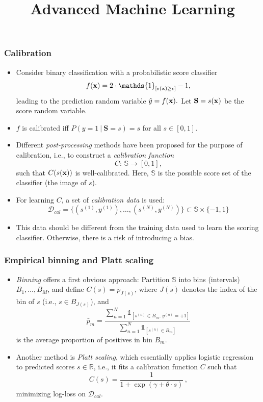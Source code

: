 \documentclass[11pt,compress,t,notes=noshow, xcolor=table]{beamer}
\title{Advanced Machine Learning}
\date{}
\begin{document}



\sloppy

\begin{frame}[t]
	\frametitle{Calibration}
	\small
	\begin{itemize}
%		
		\item Consider binary classification with a probabilistic score  classifier
%		
		$$\fx = 2 \cdot \mathds{1}_{[ s(\xv) \ge c]} -1,$$
%		
		leading to the prediction random variable $\hat{y} = f(\mathbf{x}).$ Let $\mathbf{S}=s(\mathbf{x})$ be the score random variable. 
%		
		\item $f$ is calibrated iff $P(y=1~|~\mathbf{S}=s) = s$ for all $s\in [0,1].$
%		
		\item Different \emph{post-processing} methods have been proposed for the purpose of calibration, i.e., to construct a \emph{calibration function} 
%		
		$$C: \, \mathbb{S} \to [0,1], $$
		such that $C(s(\mathbf{x}))$ is well-calibrated.
%		
		Here, $\mathbb{S}$ is the possible score set of the classifier (the image of $s$).
		
		\item For learning $C$, a set of \emph{calibration data} is used:
		$$
		\mathcal{D}_{cal} = \big\{ (s^{(1)}, y^{(1)}) , \ldots , (s^{(N)}, y^{(N)}) \big\} \subset \mathbb{S} \times \{ -1 , 1 \}
		$$ 
		
		\item This data should be different from the training data used to learn the scoring classifier. Otherwise, there is a risk of introducing a bias. 
		
	\end{itemize}
\end{frame}

\begin{frame}[t]
	\frametitle{Empirical binning and Platt scaling}
	
	\begin{itemize}
		\item \emph{Binning} offers a first obvious approach: %
		Partition $\mathbb{S}$ into bins (intervals) $B_1, \ldots , B_M$, and define 
		$C(s) = \bar{p}_{J(s)}$, 
		where $J(s)$ denotes the index of the bin of $s$ (i.e., $s \in B_{J(s)}$), and 
		$$
		\bar{p}_m = \frac{\sum_{n=1}^N \mathds{1}_{[ s^{(n)} \in B_m  , \, y^{(n)} = +1  ]} }{\sum_{n=1}^N \mathds{1}_{[ s^{(n)} \in B_m  ]} } 
		$$
		is the average proportion of positives in bin $B_m$.
		
		\item Another method is \emph{Platt scaling}, which essentially applies logistic regression to predicted scores $s \in \mathbb{R}$, i.e., it fits a calibration function $C$ such that
		$$
		C(s) = \frac{1}{1 + \exp( \gamma + \theta \cdot s) } \, ,
		$$
		minimizing log-loss on $\mathcal{D}_{cal}$.
	\end{itemize}
\end{frame}
\end{document}
